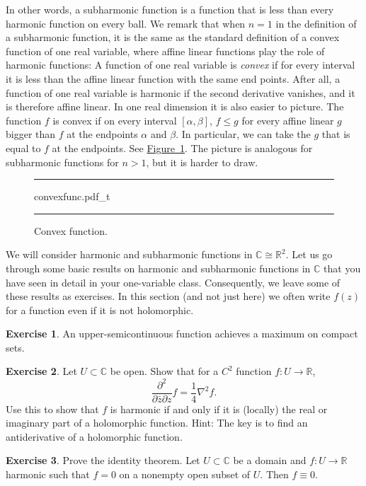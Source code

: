 \documentclass[12pt,openany]{book}
\newcommand{\C}{{\mathbb{C}}}
\newcommand{\R}{{\mathbb{R}}}
\theoremstyle{plain}
\theoremstyle{remark}
\theoremstyle{definition}
\newenvironment{exbox}{%
    \def\FrameCommand{\vrule width 1pt \relax\hspace{10pt}}%
    \MakeFramed{\advance\hsize-\width\FrameRestore}%
}{%
    \endMakeFramed
}
\newenvironment{myfig}{%
\begin{figure}[h!t]
\noindent\rule{\textwidth}{0.5pt}\vspace{12pt}\par\centering}%
{\par\noindent\rule{\textwidth}{0.5pt}
\end{figure}}
\theoremstyle{exercise}
\newtheorem{exercise}{Exercise}[section]
\theoremstyle{example}
\newcommand{\figureref}[1]{\hyperref[#1]{Figure~\ref*{#1}}}
\begin{document}
In other words, a subharmonic function is a function that is less than every
harmonic function on every ball.
We remark that when $n=1$ in the definition of a subharmonic function,
it is the same as the standard definition of a
convex function of one real variable, where affine linear functions play the role of harmonic
functions: A function of one real variable is
\emph{convex} if
for every interval it is less than the affine linear function with the same
end points.
After all, a function of one real variable is harmonic if the second
derivative vanishes, and it is therefore affine linear.
In one real dimension it is also easier to picture.
The function $f$ is convex if on
every interval $[\alpha,\beta]$, $f \leq g$ for every affine linear $g$
bigger than $f$ at the endpoints $\alpha$ and $\beta$.  In particular, we can
take the $g$ that is equal to $f$ at the endpoints.  See
\figureref{fig:convexfunc}.
The picture is analogous for subharmonic functions for $n > 1$,
but it is harder to draw.

\begin{myfig}
{convexfunc.pdf_t}
\caption{Convex function.\label{fig:convexfunc}}
\end{myfig}

We will consider harmonic and subharmonic functions in $\C \cong
\R^2$.
Let us go through some basic results on harmonic and subharmonic
functions in $\C$ that you have seen in detail in your one-variable class.
Consequently, we leave some of these results as exercises.
In this section (and not just here)
we often write $f(z)$ for a function
even if it is not holomorphic.

\begin{exbox}
\begin{exercise}
An upper-semicontinuous function achieves a maximum on compact sets.
\end{exercise}

\begin{exercise}
Let $U \subset \C$ be open.
Show that for a $C^2$ function $f \colon U \to \R$,
\begin{equation*}
\frac{\partial^2}{\partial \bar{z}\partial z} f = \frac{1}{4} \nabla^2 f .
\end{equation*}
Use this to show that $f$ is harmonic if and only if it is
(locally) the real or imaginary part
of a holomorphic function.
Hint: The key is to find an antiderivative of a holomorphic function.
\end{exercise}

\begin{exercise}
Prove the identity theorem.  Let $U \subset \C$ be a domain
and $f \colon U \to \R$ harmonic such that $f=0$ on a nonempty open subset
of $U$.  Then $f\equiv 0$.
\end{exercise}
\end{exbox}
\end{document}
